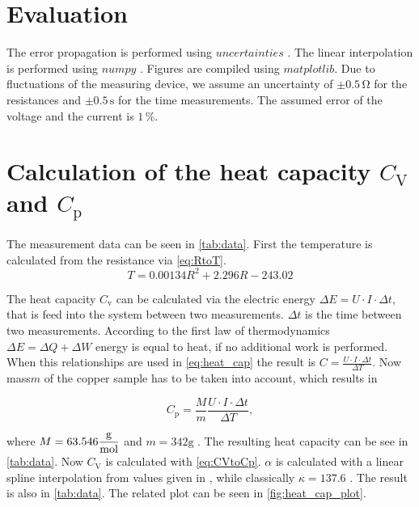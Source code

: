 \section{Evaluation}
\label{sec:Auswertung}



The error propagation is performed using $uncertainties$ \cite{unp}. The linear interpolation is performed using $numpy$ \cite{numpy}.
Figures are compiled using $matplotlib$\cite{Hunter:2007}. Due to fluctuations of the measuring device, we assume an uncertainty of
$\pm 0.5 \, \unit{\ohm}$ for the resistances and $\pm 0.5 \, \unit{\second} $ for the time measurements. 
The assumed error of the voltage and the current is $1 \, \%$.

\section{Calculation of the heat capacity $C_\text{V}$ and $C_\text{p}$}
\label{sec:CVaCp}

The measurement data can be seen in \autoref{tab:data}. First the temperature is calculated from the resistance via \eqref{eq:RtoT}.
\begin{equation}
    \label{eq:RtoT}
    T = 0.00134 R^2 + 2.296 R - 243.02
\end{equation}

The heat capacity $C_\text{v}$ can be calculated via the electric energy $\Delta E = U \cdot I \cdot \Delta t $, that is feed into the system between two measurements.
$\Delta t $ is the time between two measurements.
According to the first law of thermodynamics $ \Delta E = \Delta Q + \Delta W $ energy is equal to heat, if no additional work is performed.
When this relationships are used in \eqref{eq:heat_cap} the result is $C = \frac{U \cdot I \cdot \Delta t}{\Delta T}$. Now mass$m$ of the copper sample has to be taken into account,
which results in 

\begin{equation}
    C_\text{p} = \dfrac{M}{m} \frac{U \cdot I \cdot \Delta t}{\Delta T},
\end{equation}

where $M = 63.546 \unit{\dfrac{\gram}{\mol}}$\cite{Jefflab} and $m = 342 \unit{\gram}$ \cite{v47}.
The resulting heat capacity can be see in \autoref{tab:data}.
Now $C_\text{V} $ is calculated with \eqref{eq:CVtoCp}. $\alpha $ is calculated with a linear spline interpolation from values given in \cite{v47}, while classically $\kappa = 137.6  $ \cite{KO202193}.
The result is also in \autoref{tab:data}.
The related plot can be seen in \autoref{fig:heat_cap_plot}.

